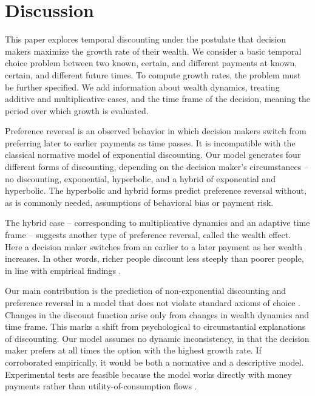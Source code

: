 
\section{Discussion}\label{sec:discussion}

This paper explores temporal discounting under the postulate that decision makers maximize the growth rate of their wealth. We consider a basic temporal choice problem between two known, certain, and different payments at known, certain, and different future times. To compute growth rates, the problem must be further specified. We add information about wealth dynamics, treating additive and multiplicative cases, and the time frame of the decision, meaning the period over which growth is evaluated.

Preference reversal is an observed behavior in which decision makers switch from preferring later to earlier payments as time passes. It is incompatible with the classical normative model of exponential discounting. Our model generates four different forms of discounting, depending on the decision maker's circumstances -- no discounting, exponential, hyperbolic, and a hybrid of exponential and hyperbolic. The hyperbolic and hybrid forms predict preference reversal without, as is commonly needed, assumptions of behavioral bias or payment risk.

The hybrid case -- corresponding to multiplicative dynamics and an adaptive time frame -- suggests another type of preference reversal, called the wealth effect. Here a decision maker switches from an earlier to a later payment as her wealth increases. In other words, richer people discount less steeply than poorer people, in line with empirical findings \citep{GreenETAL1996,EpperETAL2018}.

Our main contribution is the prediction of non-exponential discounting and preference reversal in a model that does not violate standard axioms of choice \citep{vonNeumannMorgenstern1944}. Changes in the discount function arise only from changes in wealth dynamics and time frame. This marks a shift from psychological to circumstantial explanations of discounting. Our model assumes no dynamic inconsistency, in that the decision maker prefers at all times the option with the highest growth rate. If corroborated empirically, it would be both a normative and a descriptive model. Experimental tests are feasible because the model works directly with money payments rather than utility-of-consumption flows \citep{CohenETAL2019}.

